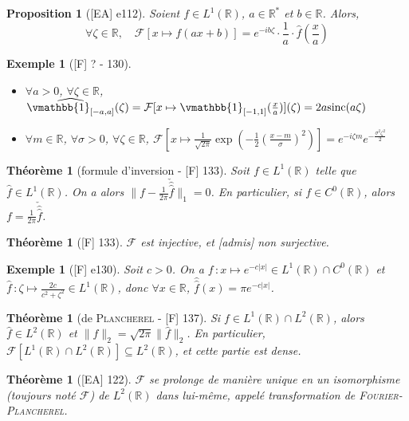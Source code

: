 \documentclass[10pt, a4paper, parskip=full, twoside, twocolumn]{report}
\newtheorem{theorem}[definition]{Théorème}
\newtheorem{proposition}[definition]{Proposition}
\newtheorem{example}[definition]{Exemple}
\newcommand{\IR}{\mathbb{R}}
\begin{document}
\begin{proposition}[\textnormal{[EA] e112}]
	Soient $f\in L^1(\IR)$, $a\in\IR^*$ et $b\in\IR$. Alors,
	$$\forall\zeta\in\IR,\quad \mathcal{F}[x\mapsto f(ax+b)] = e^{-ib\zeta}\cdot\frac{1}{a}\cdot\hat{f}(\frac{x}{a})$$
\end{proposition}

\begin{example}[\textnormal{[F] ? - 130}]
	\begin{itemize}
		\item $\forall a > 0$, $\forall \zeta\in\IR$, $\widehat{\vmathbb{1}_{[-a,a]}}(\zeta) = \mathcal{F}[x\mapsto \vmathbb{1}_{[-1,1]}(\frac{x}{a})](\zeta) = 2a\textnormal{sinc}(a\zeta)$
		\item $\forall m\in\IR$, $\forall \sigma > 0$, $\forall \zeta\in\IR$, $\mathcal{F}[x\mapsto \frac{1}{\sqrt{2\pi}}\exp\left(-\frac{1}{2}\left(\frac{x-m}{\sigma}\right)^2\right)] = e^{-i\zeta m}e^{-\frac{\sigma^2\zeta^2}{2}}$
	\end{itemize}
\end{example}

\begin{theorem}[formule d'inversion - \textnormal{[F] 133}]
	Soit $f\in L^1(\IR)$ telle que $\hat{f}\in L^1(\IR)$. On a alors $\|f-\frac{1}{2\pi}\check{\hat{\hat{f}}}\|_1 = 0$.
	En particulier, si $f\in C^0(\IR)$, alors $f = \frac{1}{2\pi}\check{\hat{\hat{f}}}$.
\end{theorem}

\begin{theorem}[\textnormal{[F] 133}]
	$\mathcal{F}$ est injective, et [admis] non surjective.
\end{theorem}

\begin{example}[\textnormal{[F] e130}]
	Soit $c> 0$. On a $f\,\colon x\mapsto e^{-c\lvert x\rvert}\in L^1(\IR)\cap C^0(\IR)$ et $\hat{f}\,\colon \zeta\mapsto\frac{2c}{c^2+\zeta^2}\in L^1(\IR)$, 
	donc $\forall x\in\IR$, $\hat{\hat{f}}(x) = \pi e^{-c\lvert x\rvert}$.
\end{example}

\begin{theorem}[de \textsc{Plancherel} - \textnormal{[F] 137}]
	\label{234dev21}
	Si $f\in L^1(\IR)\cap L^2(\IR)$, alors $\hat{f}\in L^2(\IR)$ et $\|f\|_2 = \sqrt{2\pi}\|\hat{f}\|_2$.
	En particulier, $\mathcal{F}[L^1(\IR)\cap L^2(\IR)] \subseteq L^2(\IR)$, et cette partie est dense.
\end{theorem}

\begin{theorem}[\textnormal{[EA] 122}]
	\label{234dev22}
	$\mathcal{F}$ se prolonge de manière unique en un isomorphisme (toujours noté $\mathcal{F}$) de $L^2(\IR)$ dans lui-même, appelé \emph{transformation de \textsc{Fourier-Plancherel}}.
\end{theorem}
\end{document}
